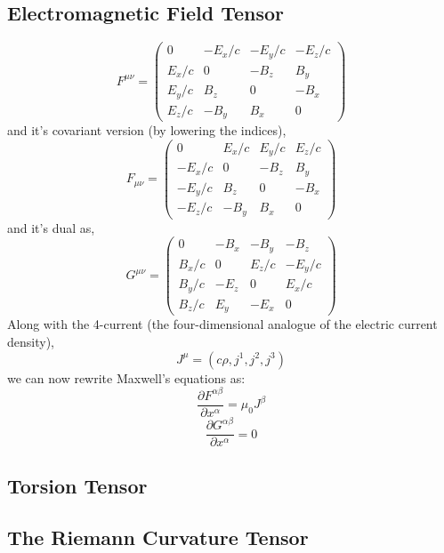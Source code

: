 \subsection{Electromagnetic Field Tensor}
\begin{equation}
F^{\mu \nu} = \begin{pmatrix}
0 & -E_{x}/c & -E_{y}/c & -E_{z}/c\\
E_{x}/c & 0 & -B_{z} & B_{y}\\
E_{y}/c & B_{z} & 0 & -B_{x}\\
E_{z}/c & -B_{y} & B_{x} & 0
\end{pmatrix}
\end{equation}
and it's covariant version (by lowering the indices),
\begin{equation}
F_{\mu \nu} = \begin{pmatrix}
0 & E_{x}/c & E_{y}/c & E_{z}/c\\
-E_{x}/c & 0 & -B_{z} & B_{y}\\
-E_{y}/c & B_{z} & 0 & -B_{x}\\
-E_{z}/c & -B_{y} & B_{x} & 0
\end{pmatrix}
\end{equation}
and it's dual as,
\begin{equation}
G^{\mu \nu} = \begin{pmatrix}
0 & -B_{x} & -B_{y} & -B_{z}\\
B_{x}/c & 0 & E_{z}/c & -E_{y}/c\\
B_{y}/c & -E_{z} & 0 & E_{x}/c\\
B_{z}/c & E_{y} & -E_{x} & 0
\end{pmatrix}
\end{equation}
Along with the 4-current (the four-dimensional analogue of the electric current density), $$J^{\mu} = (c\rho , j^{1}, j^{2}, j^{3})$$
we can now rewrite Maxwell's equations as:
\begin{equation}
\frac{\partial F^{\alpha \beta}}{\partial x^{\alpha}} = \mu_{0} J^{\beta}
\end{equation}
\begin{equation}
\frac{\partial G^{\alpha \beta}}{\partial x^{\alpha}} = 0
\end{equation}
\subsection{Torsion Tensor}
\subsection{The Riemann Curvature Tensor}
